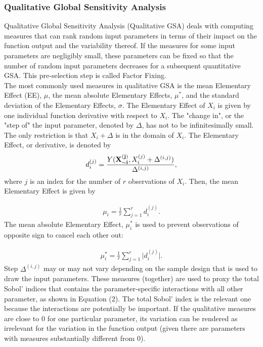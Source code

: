 \subsubsection{Qualitative Global Sensitivity Analysis}

Qualitative Global Sensitivity Analysis (Qualitative GSA) deals with computing measures that can rank random input parameters in terms of their impact on the function output and the variability thereof. If the measures for some input parameters are negligibly small, these parameters can be fixed so that the number of random input parameters decreases for a subsequent quantitative GSA. This pre-selection step is called Factor Fixing.  \\


The most commonly used measures in qualitative GSA is the mean Elementary Effect (EE), $\mu$, the mean absolute Elementary Effects, $\mu^*$, and the standard deviation of the Elementary Effects, $\sigma$. The Elementary Effect of $X_i$ is given by one individual function derivative with respect to $X_i$. The "change in", or the "step of" the input parameter, denoted by $\Delta$, has not to be infinitesimally small. The only restriction is that $X_i + \Delta$ is in the domain of $X_i$. The Elementary Effect, or derivative, is denoted by
\begin{align}
d_i^{(j)} =  \frac{Y(\bold{X_{\sim i}^{(j)}}, X_i^{(j)} + \Delta^{(i,j)})}{\Delta^{(i,j)}},
\end{align}
where $j$ is an index for the number of $r$ observations of $X_i$.
Then, the mean Elementary Effect is given by

\begin{align}
\mu_i = \frac{1}{r} \sum_{j=1}^{r} d_i^{(j)}.
\end{align}
\noindent
The mean absolute Elementary Effect, $\mu_i^*$ is used to prevent observations of opposite sign to cancel each other out:

\begin{align}
\mu_i^* = \frac{1}{r} \sum_{j=1}^{r} \big| d_i^{(j)} \big|.
\end{align}
\noindent
Step $\Delta^{(i,j)}$ may or may not vary depending on the sample design that is used to draw the input parameters. These measures (together) are used to proxy the total Sobol' indices that contains the parameter-specific interactions with all other parameter, as shown in Equation (2). The total Sobol' index is the relevant one because the interactions are potentially be important. If the qualitative measures are close to 0 for one particular parameter, its variation can be rendered as irrelevant for the variation in the function output (given there are parameters with measures substantially different from 0).
